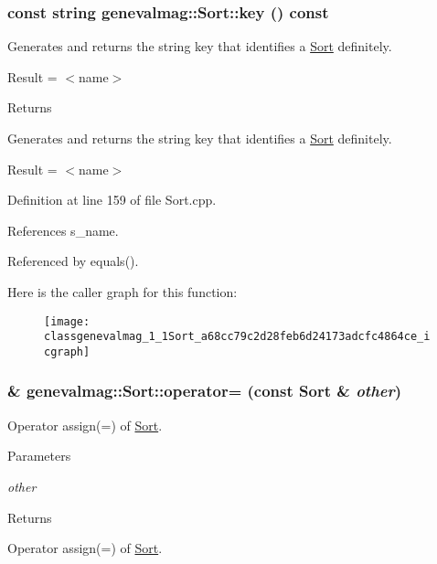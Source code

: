 \hypertarget{classgenevalmag_1_1Sort_a68cc79c2d28feb6d24173adcfc4864ce}{
\subsubsection[{key}]{\setlength{\rightskip}{0pt plus 5cm}const string genevalmag::Sort::key () const}}
\label{classgenevalmag_1_1Sort_a68cc79c2d28feb6d24173adcfc4864ce}
Generates and returns the string key that identifies a \hyperlink{classgenevalmag_1_1Sort}{Sort} definitely.\par
 \par
 Result = $<$name$>$\par


\begin{DoxyReturn}{Returns}

\end{DoxyReturn}
Generates and returns the string key that identifies a \hyperlink{classgenevalmag_1_1Sort}{Sort} definitely.

Result = $<$name$>$ 

Definition at line 159 of file Sort.cpp.



References s\_\-name.



Referenced by equals().



Here is the caller graph for this function:\nopagebreak
\begin{figure}[H]
\begin{center}
\leavevmode
\texttt{[image: classgenevalmag\_1\_1Sort\_a68cc79c2d28feb6d24173adcfc4864ce\_icgraph]}
\end{center}
\end{figure}


\hypertarget{classgenevalmag_1_1Sort_ac04dccc91f8c8bec5af9b86f9f3c7b7a}{
\subsubsection[{operator=}]{ \& genevalmag::Sort::operator= (const {\bf Sort} \& {\em other})}}
\label{classgenevalmag_1_1Sort_ac04dccc91f8c8bec5af9b86f9f3c7b7a}
Operator assign(=) of \hyperlink{classgenevalmag_1_1Sort}{Sort}. 
\begin{DoxyParams}{Parameters}
\item[{\em other}]\end{DoxyParams}
\begin{DoxyReturn}{Returns}

\end{DoxyReturn}
Operator assign(=) of \hyperlink{classgenevalmag_1_1Sort}{Sort}. 

